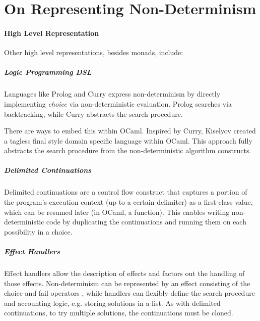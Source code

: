 \chapter{On Representing Non-Determinism}
\label{sec:NonDeterminismAppendix}

\subsubsection{High Level Representation}
Other high level representations, besides monads, include:

\paragraph{Logic Programming DSL} Languages like Prolog \cite{Prolog} and Curry \cite{CurryLang} express non-determinism by directly implementing \textit{choice} via non-deterministic evaluation. Prolog searches via backtracking, while Curry abstracts the search procedure.

There are ways to embed this within OCaml. Inspired by Curry, Kiselyov \cite{NondetDSL} created a tagless final style \cite{TaglessFinalDSL} domain specific language within OCaml. This approach fully abstracts the search procedure from the non-deterministic algorithm constructs.
\paragraph{Delimited Continuations} Delimited continuations \cite{DelimitedControl, ShiftReset} are a control flow construct that captures a portion of the program's execution context (up to a certain delimiter) as a first-class value, which can be resumed later (in OCaml, a function). This enables writing non-deterministic code by duplicating the continuations and running them on each possibility in a choice.

\paragraph{Effect Handlers} Effect handlers allow the description of effects and factors out the handling of those effects. Non-determinism can be represented by an effect consisting of the choice and fail operators \cite{EffectsExamples, HandlersInAction}, while handlers can flexibly define the search procedure and accounting logic, e.g. storing solutions in a list. As with delimited continuations, to try multiple solutions, the {continuations} must be cloned.


